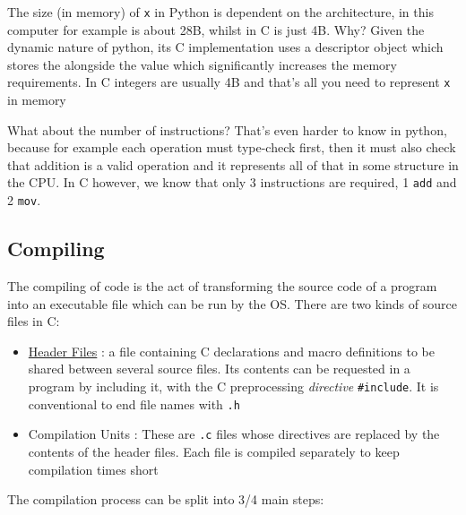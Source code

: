 \par{The size (in memory) of \texttt{x} in Python is dependent on the architecture, in this computer for example is about 28B, whilst in C is just 4B. Why? Given the dynamic nature of python, its C implementation uses a descriptor object which stores the alongside the value which significantly increases the memory requirements. In C integers are usually 4B and that's all you need to represent \texttt{x} in memory }

\par{What about the number of instructions? That's even harder to know in python, because for example each operation must type-check first, then it must also check that addition is a valid operation and it represents all of that in some structure in the CPU. In C however, we know that only 3 instructions are required, 1 \texttt{add} and 2 \texttt{mov}.}


\subsection{Compiling}

\par{The compiling of code is the act of transforming the source code of a program into an executable file which can be run by the OS. There are two kinds of source files in C:}

\begin{itemize}
	\item \href{https://gcc.gnu.org/onlinedocs/cpp/Header-Files.html}{Header Files} : a file containing C declarations and macro definitions to be shared between several source files. Its contents can be requested in a program by including it, with the C preprocessing \textit{directive} \texttt{\#include}.  It is conventional to end file names with \texttt{.h}

	\item Compilation Units : These are \texttt{.c} files whose directives are replaced by the contents of the header files. Each file is compiled separately to keep compilation times short
\end{itemize}

\par{The compilation process can be split into 3/4 main steps:}


